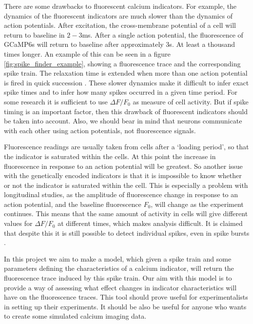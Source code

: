 \documentclass[a4paper,12pt]{article}
\theoremstyle{definition}
\begin{document}
There are some drawbacks to fluorescent calcium indicators. For example, the dynamics of the fluorescent indicators are much slower than the dynamics of action potentials. After excitation, the cross-membrane potential of a cell will return to baseline in $2-3$ms. After a single action potential, the fluorescence of GCaMP6s will return to baseline after approximately $3$s. At least a thousand times longer. An example of this can be seen in a figure \ref{fig:spike_finder_example}, showing a fluorescence trace and the corresponding spike train. The relaxation time is extended when more than one action potential is fired in quick succession \cite{chen}. These slower dynamics make it difficult to infer exact spike times and to infer how many spikes occurred in a given time period. For some research it is sufficient to use $\Delta F/F_0$ as measure of cell activity. But if spike timing is an important factor, then this drawback of fluorescent indicators should be taken into account. Also, we should bear in mind that neurons communicate with each other using action potentials, not fluorescence signals.

Fluorescence readings are usually taken from cells after a `loading period', so that the indicator is saturated within the cells. At this point the increase in fluorescence in response to an action potential will be greatest. So another issue with the genetically encoded indicators is that it is impossible to know whether or not the indicator is saturated within the cell. This is especially a problem with longitudinal studies, as the amplitude of fluorescence change in response to an action potential, and the baseline fluorescence $F_0$, will change as the experiment continues. This means that the same amount of activity in cells will give different values for $\Delta F/F_0$ at different times, which makes analysis difficult. It is claimed that despite this it is still possible to detect individual spikes, even in spike bursts \cite{chen}.

In this project we aim to make a model, which given a spike train and some parameters defining the characteristics of a calcium indicator, will return the fluorescence trace induced by this spike train. Our aim with this model is to provide a way of assessing what effect changes in indicator characteristics will have on the fluorescence traces. This tool should prove useful for experimentalists in setting up their experiments. It should be also be useful for anyone who wants to create some simulated calcium imaging data.
\end{document}

